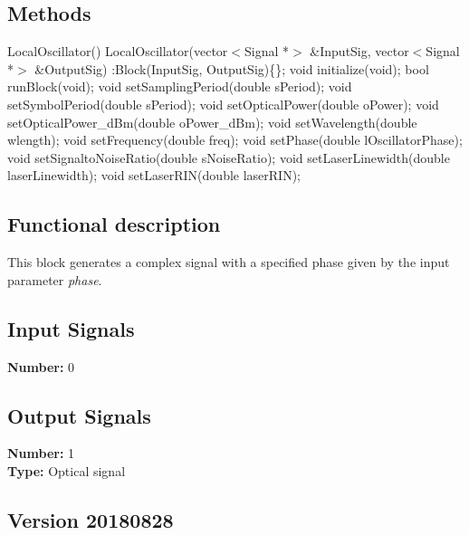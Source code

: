 %

\subsection*{Methods}

LocalOscillator() {}
\bigbreak
LocalOscillator(vector$<$Signal *$>$ \&InputSig, vector$<$Signal *$>$ \&OutputSig) :Block(InputSig, OutputSig)\{\};
\bigbreak
void initialize(void);
\bigbreak
bool runBlock(void);
\bigbreak
void setSamplingPeriod(double sPeriod);
\bigbreak
void setSymbolPeriod(double sPeriod);
\bigbreak
void setOpticalPower(double oPower);
\bigbreak
void setOpticalPower\_dBm(double oPower\_dBm);
\bigbreak
void setWavelength(double wlength);
\bigbreak
void setFrequency(double freq);
\bigbreak
void setPhase(double lOscillatorPhase);
\bigbreak
void setSignaltoNoiseRatio(double sNoiseRatio);
\bigbreak
void setLaserLinewidth(double laserLinewidth);
\bigbreak
void setLaserRIN(double laserRIN);

\subsection*{Functional description}

This block generates a complex signal with a specified phase given by the input parameter \textit{phase}.

\subsection*{Input Signals}

\textbf{Number:} 0

\subsection*{Output Signals}

\textbf{Number:} 1\\
\textbf{Type:} Optical signal

\subsection*{Version 20180828}

